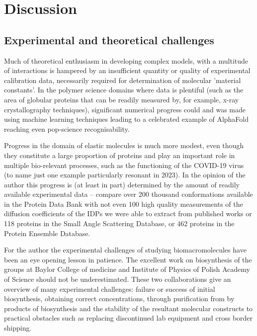 \documentclass{doctoral}
\begin{document}
\chapter{Discussion}
\section{Experimental and theoretical challenges}
Much of theoretical enthusiasm in developing complex models, with a multitude of interactions is hampered by an insufficient quantity or quality of experimental calibration data, necessarily required for determination of molecular 'material constants'.
In the polymer science domains where data is plentiful (such as the area of globular proteins that can be readily measured by, for example, x-ray crystallography techniques), significant numerical progress could and was made using machine learning techniques leading to a celebrated example of AlphaFold \cite{Jumper_2021} reaching even pop-science recognisability.

Progress in the domain of elastic molecules is much more modest, even though they constitute a large proportion of proteins\cite{Ward_2004} and play an important role in multiple bio-relevant processes, such as the functioning of the COVID-19 virus\cite{Rozycki_2022} (to name just one example particularly resonant in 2023).
In the opinion of the author this progress is (at least in part) determined by the amount of readily available experimental data -- compare over 200 thousand conformations available in the Protein Data Bank\cite{rcsb_org} with not even 100 high quality measurements of the diffusion coefficients of the IDPs we were able to extract from published works\cite{Waszkiewicz_2024_mda} or 118 proteins in the Small Angle Scattering Database\cite{sasdb_org}, or 462 proteins in the Protein Ensemble Database\cite{proteinensemble_org}.

For the author the experimental challenges of studying biomacromolecules have been an eye opening lesson in patience.
The excellent work on biosynthesis of the groups at Baylor College of medicine and Institute of Physics of Polish Academy of Science should not be underestimated.
These two collaborations give an overview of many experimental challenges: failure or success of initial biosynthesis, obtaining correct concentrations, through purification from by products of biosynthesis and the stability of the resultant molecular constructs to practical obstacles such as replacing discontinued lab equipment and cross border shipping.
\end{document}
